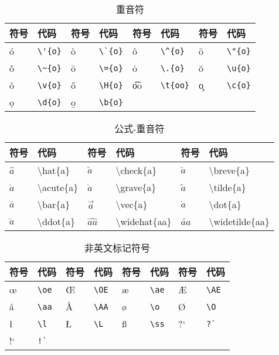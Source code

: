 \documentclass[UTF8,fontset=ubuntu]{ctexart}
\begin{document}
\begin{table}[H]
\begin{tabular}{l l l l l l l l}
	\hline
	符号 & 代码 & 符号 & 代码 & 符号 & 代码 & 符号 & 代码\\
	\hline
	\'{o} & \verb+\'{o}+ & \`{o} & \verb+\`{o}+ & \^{o} & \verb+\^{o}+ & \"{o} & \verb+\"{o}+\\
	\~{o} & \verb+\~{o}+ & \={o} & \verb+\={o}+ & \.{o} & \verb+\.{o}+ & \u{o} & \verb+\u{o}+\\
	\v{o} & \verb+\v{o}+ & \H{o} & \verb+\H{o}+ & \t{oo} & \verb+\t{oo}+ & \c{o} & \verb+\c{o}+\\
	\d{o} & \verb+\d{o}+ & \b{o} & \verb+\b{o}+\\
	\hline
\end{tabular}
\caption{重音符}
\end{table}

\begin{table}[H]
\begin{minipage}{\textwidth}
\begin{tabular}{l l l l l l}
	\hline
	符号 & 代码 & 符号 & 代码 & 符号 & 代码\\
	\hline
	$\hat{a}$ & \textbackslash  hat\{a\} & $\check{a}$ & \textbackslash  check\{a\} & $\breve{a}$ & \textbackslash  breve\{a\}\\
	$\acute{a}$ & \textbackslash  acute\{a\} & $\grave{a}$ & \textbackslash  grave\{a\} & $\tilde{a}$ & \textbackslash  tilde\{a\}\\
	$\bar{a}$ & \textbackslash  bar\{a\} & $\vec{a}$ & \textbackslash  vec\{a\} & $\dot{a}$ & \textbackslash  dot\{a\}\\
	$\ddot{a}$ & \textbackslash  ddot\{a\} & $\widehat{aa}$ & \textbackslash  widehat\{aa\} & $\widetilde{aa}$ & \textbackslash  widetilde\{aa\}\\
	\hline
\end{tabular}
\end{minipage}
\caption{公式-重音符}
\end{table}

\begin{table}[H]
\begin{tabular}{l l l l l l l l}
	\hline
	符号 & 代码 & 符号 & 代码 & 符号 & 代码 & 符号 & 代码\\
	\hline
	\oe & \verb+\oe+ & \OE & \verb+\OE+ & \ae & \verb+\ae+ & \AE & \verb+\AE+\\
	\aa & \verb+\aa+ & \AA & \verb+\AA+ & \o & \verb+\o+ & \O & \verb+\O+\\
	\l & \verb+\l+ & \L & \verb+\L+ & \ss & \verb+\ss+ & ?` & \verb+?`+\\
	!` & \verb+!`+\\
	\hline
\end{tabular}
\caption{非英文标记符号}
\end{table}
\end{document}
